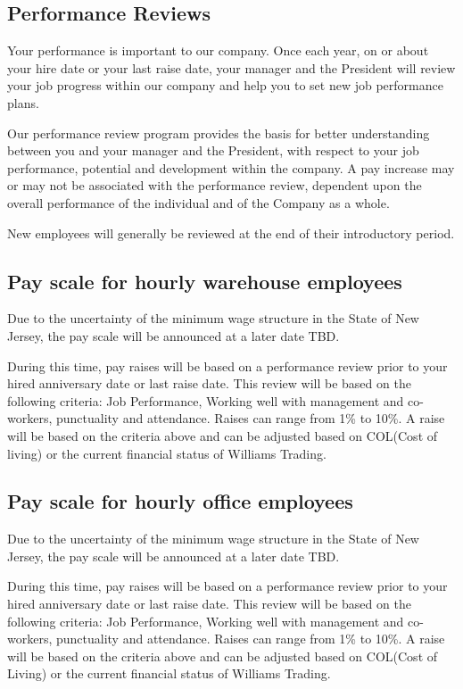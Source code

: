 \documentclass{book}
\begin{document}
\subsection{Performance Reviews}

Your performance is important to our company. Once each year, on or about your hire date or your last raise date, your manager and the President will review your job progress within our company and help you to set new job performance plans.

Our performance review program provides the basis for better understanding between you and your manager and the President, with respect to your job performance, potential and development within the company. A pay increase may or may not be associated with the performance review, dependent upon the overall performance of the individual and of the Company as a whole.

New employees will generally be reviewed at the end of their introductory period.

\subsection{Pay scale for hourly warehouse employees}

Due to the uncertainty of the minimum wage structure in the State of New Jersey, the pay scale will be announced at a later date TBD.

During this time, pay raises will be based on a performance review prior to your hired anniversary date or last raise date. This review will be based on the following criteria: Job Performance, Working well with management and co-workers, punctuality and attendance. Raises can range from 1\% to 10\%. A raise will be based on the criteria above and can be adjusted based on COL(Cost of living) or the current financial status of Williams Trading.

\subsection{Pay scale for hourly office employees}

Due to the uncertainty of the minimum wage structure in the State of New Jersey, the pay scale will be announced at a later date TBD.

During this time, pay raises will be based on a performance review prior to your hired anniversary date or last raise date. This review will be based on the following criteria: Job Performance, Working well with management and co-workers, punctuality and attendance. Raises can range from 1\% to 10\%. A raise will be based on the criteria above and can be adjusted based on COL(Cost of Living) or the current financial status of Williams Trading.
\end{document}
